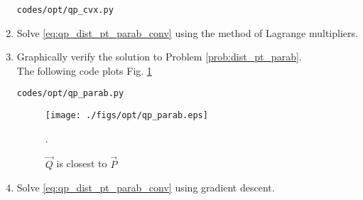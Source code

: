 \begin{enumerate}[label=\arabic*.,ref=\thesection.\theenumi]
\begin{lstlisting}
codes/opt/qp_cvx.py
\end{lstlisting}

\item Solve \eqref{eq:qp_dist_pt_parab_conv} using the method of Lagrange multipliers.
\item Graphically verify the solution to Problem \ref{prob:dist_pt_parab}. 
\\
\solution 
The following code plots Fig. \ref{fig:qp_parab}
%	
\begin{lstlisting}
codes/opt/qp_parab.py
\end{lstlisting}

%
\begin{figure}[!ht]
\centering
\texttt{[image: ./figs/opt/qp\_parab.eps]}
\caption{ $\vec{Q}$ is closest to $\vec{P}$}.
\label{fig:qp_parab}
\end{figure}
%
%
%	
\item Solve \eqref{eq:qp_dist_pt_parab_conv} using gradient descent.
%
\end{enumerate}
